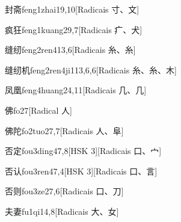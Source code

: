 \begin{entry}{封斋}{feng1zhai1}{9,10}[Radicais ⼨、⽂]
\end{entry}

\begin{entry}{疯狂}{feng1kuang2}{9,7}[Radicais ⽧、⽝]
\end{entry}

\begin{entry}{缝纫}{feng2ren4}{13,6}[Radicais ⽷、⽷]
\end{entry}

\begin{entry}{缝纫机}{feng2ren4ji1}{13,6,6}[Radicais ⽷、⽷、⽊]
\end{entry}

\begin{entry}{凤凰}{feng4huang2}{4,11}[Radicais ⼏、⼏]
\end{entry}

\begin{entry}{佛}{fo2}{7}[Radical ⼈]
\end{entry}

\begin{entry}{佛陀}{fo2tuo2}{7,7}[Radicais ⼈、⾩]
\end{entry}

\begin{entry}{否定}{fou3ding4}{7,8}[HSK 3][Radicais ⼝、⼧]
\end{entry}

\begin{entry}{否认}{fou3ren4}{7,4}[HSK 3][Radicais ⼝、⾔]
\end{entry}

\begin{entry}{否则}{fou3ze2}{7,6}[Radicais ⼝、⼑]
\end{entry}

\begin{entry}{夫妻}{fu1qi1}{4,8}[Radicais ⼤、⼥]
\end{entry}

